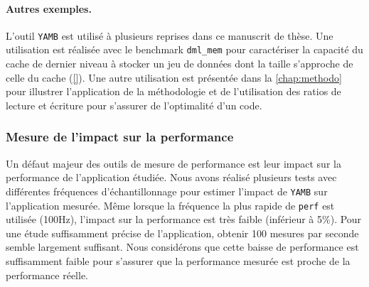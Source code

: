         \paragraph{Autres exemples.} L'outil \verb|YAMB| est utilisé à plusieurs reprises dans ce manuscrit de thèse. Une utilisation est réalisée avec le benchmark \verb=dml_mem= pour caractériser la capacité du cache de dernier niveau à stocker un jeu de données dont la taille s'approche de celle du cache (\autoref{}). Une autre utilisation est présentée dans la \autoref{chap:methodo} pour illustrer l'application de la méthodologie et de l'utilisation des ratios de lecture et écriture pour s'assurer de l'optimalité d'un code.
        
        

    \subsubsection{Mesure de l'impact sur la performance}
        Un défaut majeur des outils de mesure de performance est leur impact sur la performance de l'application étudiée. Nous avons réalisé plusieurs tests avec différentes fréquences d'échantillonnage pour estimer l'impact de \verb|YAMB| sur l'application mesurée. Même lorsque la fréquence la plus rapide de \verb=perf= est utilisée (100Hz), l'impact sur la performance est très faible (inférieur à 5\%). Pour une étude suffisamment précise de l'application, obtenir 100 mesures par seconde semble largement suffisant. Nous considérons que cette baisse de performance est suffisamment faible pour s'assurer que la performance mesurée est proche de la performance réelle.
        